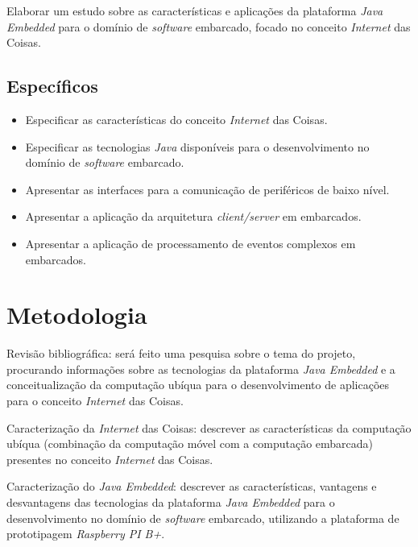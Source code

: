 Elaborar um estudo sobre as características e aplicações da plataforma
\textit{Java Embedded} para o domínio de \textit{software} embarcado, focado no
conceito \textit{Internet} das Coisas.

\newpage
\subsection{Específicos}

\begin{itemize}

    \item Especificar as características do conceito \textit{Internet} das
      Coisas.

    \item Especificar as tecnologias \textit{Java} disponíveis para o
      desenvolvimento no domínio de \textit{software} embarcado.

    \item Apresentar as interfaces para a comunicação de periféricos de baixo
    nível.

    \item Apresentar a aplicação da arquitetura \textit{client/server} em
    embarcados.

    \item Apresentar a aplicação de processamento de eventos complexos em
    embarcados.

\end{itemize}

\section{Metodologia}

Revisão bibliográfica: será feito uma pesquisa sobre o tema do projeto,
procurando informações sobre as tecnologias da plataforma \textit{Java
  Embedded} e a conceitualização da computação ubíqua para o desenvolvimento de
aplicações para o conceito \textit{Internet} das Coisas.

Caracterização da \textit{Internet} das Coisas: descrever as características da
computação ubíqua (combinação da computação móvel com a computação embarcada)
presentes no conceito \textit{Internet} das Coisas.

Caracterização do \textit{Java Embedded}: descrever as características,
vantagens e desvantagens das tecnologias da plataforma \textit{Java Embedded}
para o desenvolvimento no domínio de \textit{software} embarcado, utilizando a
plataforma de prototipagem \textit{Raspberry PI B+}.

